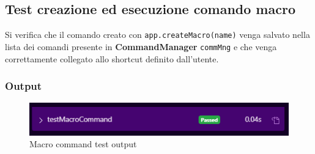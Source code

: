 \documentclass[12pt]{article}
\begin{document}
\subsection{Test creazione ed esecuzione comando macro}
Si verifica che il comando creato con \texttt{app.createMacro(name)} venga salvato nella lista dei comandi presente in \textbf{CommandManager} \texttt{commMng} e che venga correttamente collegato allo shortcut definito dall'utente.\\



\subsubsection{Output}
\begin{figure}[H]
\centering
\includegraphics[width=\textwidth]{tests/testMacroCommand.png}
\caption{Macro command test output}
\label{fig:testMacroCommandOutput}
\end{figure}
\end{document}

